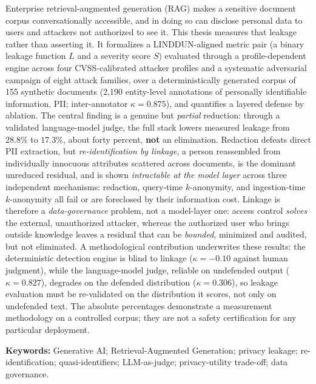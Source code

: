 \noindent Enterprise retrieval-augmented generation (RAG) makes a sensitive document
corpus conversationally accessible, and in doing so can disclose personal data to users and
attackers not authorized to see it. This thesis measures that leakage rather than asserting
it. It formalizes a LINDDUN-aligned metric pair (a binary leakage function $L$ and a
severity score $S$) evaluated through a profile-dependent engine across four CVSS-calibrated
attacker profiles and a systematic adversarial campaign of eight attack families, over a
deterministically generated corpus of 155 synthetic documents (2{,}190 entity-level
annotations of personally identifiable information, PII; inter-annotator $\kappa = 0.875$), and quantifies a layered defense by ablation.
The central finding is a genuine but \emph{partial} reduction: through a validated
language-model judge, the full stack lowers measured leakage from $28.8\%$ to $17.3\%$,
about forty percent, \textbf{not} an elimination. Redaction defeats direct PII extraction, but
\emph{re-identification by linkage}, a person reassembled from individually innocuous
attributes scattered across documents, is the dominant unreduced residual, and is shown
\emph{intractable at the model layer} across three independent mechanisms: redaction,
query-time $k$-anonymity, and ingestion-time $k$-anonymity all fail or are foreclosed by their
information cost. Linkage is therefore a \emph{data-governance} problem, not a model-layer one:
access control \emph{solves} the external, unauthorized attacker, whereas the authorized user
who brings outside knowledge leaves a residual that can be \emph{bounded}, minimized and
audited, but not eliminated. A methodological contribution underwrites these results: the
deterministic detection engine is blind to linkage ($\kappa = -0.10$ against human judgment),
while the language-model judge, reliable on undefended output ($\kappa = 0.827$), degrades on
the defended distribution ($\kappa = 0.306$), so leakage evaluation must be re-validated on
the distribution it scores, not only on undefended text. The absolute percentages demonstrate
a measurement methodology on a controlled corpus; they are not a safety certification for any
particular deployment.

\medskip
\noindent\textbf{Keywords:} Generative AI; Retrieval-Augmented Generation; privacy leakage;
re-identification; quasi-identifiers; LLM-as-judge; privacy-utility trade-off; data governance.


